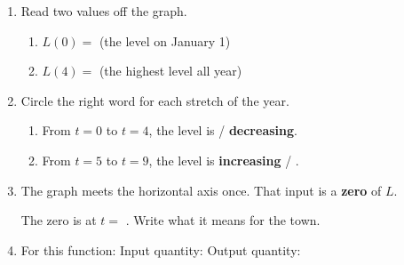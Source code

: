 \documentclass[10pt]{article}
\begin{document}
\boxguard
\begin{tcolorbox}[colback=white, colframe=black!40,
    title=\textbf{Tier R --- Remediate},
    fonttitle=\bfseries, arc=2mm, left=3mm, right=3mm, top=2mm, bottom=2mm]

\begin{enumerate}[itemsep=8pt]
  \item Read two values off the graph.

        \begin{enumerate}[label=(\alph*), itemsep=4pt]
          \item $L(0) = $  \quad (the level on January 1)
          \item $L(4) = $  \quad (the highest level all year)
        \end{enumerate}

  \item Circle the right word for each stretch of the year.

        \begin{enumerate}[label=(\alph*), itemsep=4pt]
          \item From $t = 0$ to $t = 4$, the level is
                 / \textbf{decreasing}.
          \item From $t = 5$ to $t = 9$, the level is
                \textbf{increasing} / .
        \end{enumerate}

  \item The graph meets the horizontal axis once. That input is a
        \textbf{zero} of $L$.

        \vspace{0.05in}
        The zero is at $t = $ . Write what it means for the town.

        \vspace{0.05in}

  \item For this function: \quad Input quantity:  \quad
        Output quantity: 
\end{enumerate}
\end{tcolorbox}

\vspace{0.1in}
\end{document}
